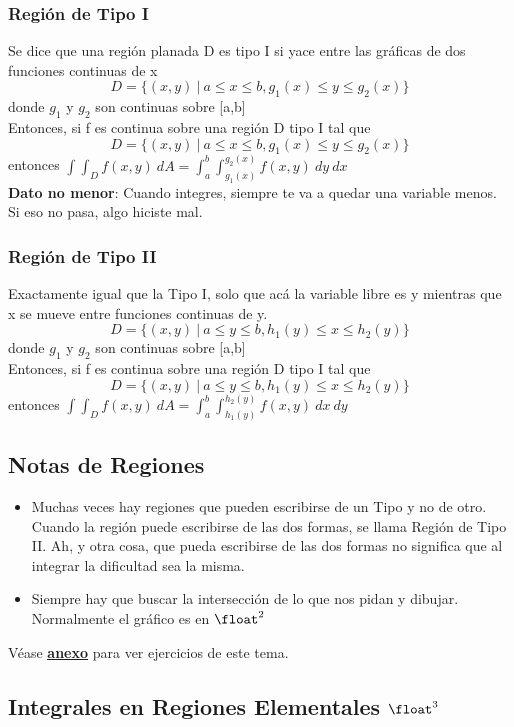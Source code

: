 \documentclass[10pt,a4paper]{article}
\begin{document}
\subsubsection*{Región de Tipo I}
Se dice que una región planada D es tipo I si yace entre las gráficas de dos funciones continuas de x
\[D = \{(x,y) \ | \ a \le x \le b, g_{1}(x) \le y \le g_{2}(x)\}\] 
donde $g_{1}$ y $g_{2}$ son continuas sobre [a,b] \\
Entonces, si f es continua sobre una región D tipo I tal que 
\[D = \{(x,y) \ | \ a \le x \le b, g_{1}(x) \le y \le g_{2}(x)\}\]
entonces $\int\int_{D}f(x,y) \ dA = \int^{b}_{a}\int^{g_{2}(x)}_{g_{1}(x)} f(x,y) \ dy \ dx $ \\
\textbf{Dato no menor}: Cuando integres, siempre te va a quedar una variable menos. Si eso no pasa, algo hiciste mal. 
\subsubsection*{Región de Tipo II}
Exactamente igual que la Tipo I, solo que acá la variable libre es y mientras que x se mueve entre funciones continuas de y.
\[D = \{(x,y) \ | \ a \le y \le b, h_{1}(y) \le x \le h_{2}(y)\}\] 
donde $g_{1}$ y $g_{2}$ son continuas sobre [a,b] \\
Entonces, si f es continua sobre una región D tipo I tal que 
\[D = \{(x,y) \ | \ a \le y \le b, h_{1}(y) \le x \le h_{2}(y)\}\]
entonces $\int\int_{D}f(x,y) \ dA = \int^{b}_{a}\int^{h_{2}(y)}_{h_{1}(y)} f(x,y) \ dx \ dy $ \\
\subsection*{Notas de Regiones}
\begin{itemize}
    \item Muchas veces hay regiones que pueden escribirse de un Tipo y no de otro. Cuando la región puede escribirse de las dos formas, se llama Región de Tipo II. Ah, y otra cosa, que pueda escribirse de las dos formas no significa que al integrar la dificultad sea la misma. 
    \item Siempre hay que buscar la intersección de lo que nos pidan y dibujar. Normalmente el gráfico es en $\float^{2}$
\end{itemize}
Véase \hyperref[subsec:integrales_regiones_elementales]{\textbf{\underline{anexo}}} para ver ejercicios de este tema. 
\subsection*{Integrales en Regiones Elementales $\float^{3}$}
\end{document}
